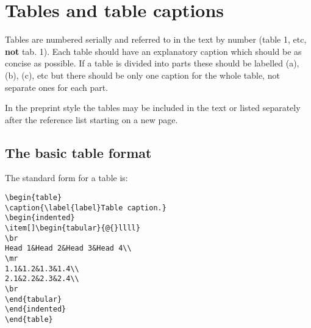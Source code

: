\documentclass[12pt]{iopart}
\begin{document}
\section{Tables and table captions}
Tables are numbered serially and referred to in the text 
by number (table 1, etc, {\bf not} tab. 1). Each table should have an 
explanatory caption which should be as concise as possible. If a table 
is divided into parts these should be labelled \pt(a), \pt(b), 
\pt(c), etc but there should be only one caption for the whole 
table, not separate ones for each part.

In the preprint style the tables may be included in the text 
or listed separately after the reference list 
starting on a new page. 

\subsection{The basic table format}
The standard form for a table is:
\small\begin{verbatim}
\begin{table}
\caption{\label{label}Table caption.}
\begin{indented}
\item[]\begin{tabular}{@{}llll}
\br
Head 1&Head 2&Head 3&Head 4\\
\mr
1.1&1.2&1.3&1.4\\
2.1&2.2&2.3&2.4\\
\br
\end{tabular}
\end{indented}
\end{table}
\end{verbatim}\normalsize
\end{document}
